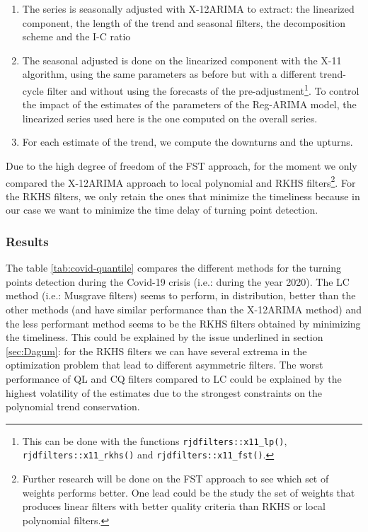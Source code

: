 \documentclass[fleqn,10pt]{latex/stylish_article} %
\newcommand\1{\mathds{1}}
\begin{document}
\begin{enumerate}
\def\labelenumi{\arabic{enumi}.}
\item
  The series is seasonally adjusted with X-12ARIMA to extract: the linearized component, the length of the trend and seasonal filters, the decomposition scheme and the I-C ratio
\item
  The seasonal adjusted is done on the linearized component with the X-11 algorithm, using the same parameters as before but with a different trend-cycle filter and without using the forecasts of the pre-adjustment\footnote{
    This can be done with the \faRProject{} functions \texttt{rjdfilters::x11\_lp()}, \texttt{rjdfilters::x11\_rkhs()} and \texttt{rjdfilters::x11\_fst()}.}. To control the impact of the estimates of the parameters of the Reg-ARIMA model, the linearized series used here is the one computed on the overall series.
\item
  For each estimate of the trend, we compute the downturns and the upturns.
\end{enumerate}

Due to the high degree of freedom of the FST approach, for the moment we only compared the X-12ARIMA approach to local polynomial and RKHS filters\footnote{
  Further research will be done on the FST approach to see which set of weights performs better. One lead could be the study the set of weights that produces linear filters with better quality criteria than RKHS or local polynomial filters.}. For the RKHS filters, we only retain the ones that minimize the timeliness because in our case we want to minimize the time delay of turning point detection.

\hypertarget{results}{%
\subsubsection{Results}\label{results}}

The table \ref{tab:covid-quantile} compares the different methods for the turning points detection during the Covid-19 crisis (i.e.: during the year 2020). The LC method (i.e.: Musgrave filters) seems to perform, in distribution, better than the other methods (and have similar performance than the X-12ARIMA method) and the less performant method seems to be the RKHS filters obtained by minimizing the timeliness. This could be explained by the issue underlined in section \ref{sec:Dagum}: for the RKHS filters we can have several extrema in the optimization problem that lead to different asymmetric filters. The worst performance of QL and CQ filters compared to LC could be explained by the highest volatility of the estimates due to the strongest constraints on the polynomial trend conservation.
\end{document}
